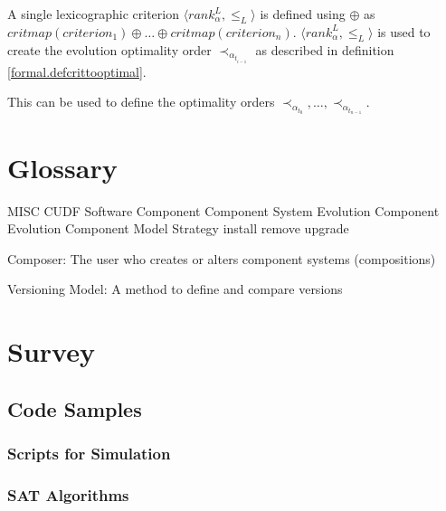A single lexicographic criterion $\langle  rank^L_{\alpha}, \leq_L \rangle$ is defined using $\oplus$ as $critmap(criterion_1) \oplus \ldots \oplus critmap(criterion_n)$.
$\langle  rank^L_{\alpha}, \leq_L \rangle$ is used to create the evolution optimality order $\prec_{\alpha_{t_{i-1}}}$ as described in definition \ref{formal.defcrittooptimal}.

This can be used to define the optimality orders $\prec_{\alpha_{t_0}},\ldots, \prec_{\alpha_{t_{n-1}}}$.


\chapter{Glossary}
MISC
CUDF
Software Component
Component System Evolution
Component Evolution
Component Model
Strategy
install
remove
upgrade

Composer: The user who creates or alters component systems (compositions)

Versioning Model: A method to define and compare versions

\chapter{Survey}
\label{apx.survey}

\section{Code Samples}
\subsection{Scripts for Simulation}
\subsection{SAT Algorithms}